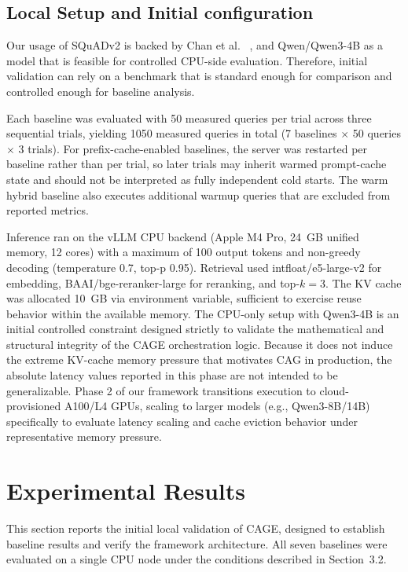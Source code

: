 \documentclass[12pt,a4paper]{article}
\let\cite\citep
\begin{document}
\subsection{Local Setup and Initial configuration}
Our usage of SQuADv2 is backed by Chan et al. ~\cite{yu2024dontdorag}, and Qwen/Qwen3-4B as a model that is feasible for controlled CPU-side evaluation. Therefore, initial validation can rely on a benchmark that is standard enough for comparison and controlled enough for baseline analysis.

Each baseline was evaluated with 50 measured queries per trial across three sequential trials, yielding 1050 measured queries in total (7 baselines $\times$ 50 queries $\times$ 3 trials). For prefix-cache-enabled baselines, the server was restarted per baseline rather than per trial, so later trials may inherit warmed prompt-cache state and should not be interpreted as fully independent cold starts. The warm hybrid baseline also executes additional warmup queries that are excluded from reported metrics.

Inference ran on the vLLM CPU backend (Apple M4 Pro, 24~GB unified memory, 12 cores) with a maximum of 100 output tokens and non-greedy decoding (temperature 0.7, top-p 0.95). Retrieval used intfloat/e5-large-v2 for embedding, BAAI/bge-reranker-large for reranking, and top-$k = 3$. The KV cache was allocated 10~GB via environment variable, sufficient to exercise reuse behavior within the available memory. The CPU-only setup with Qwen3-4B is an initial controlled constraint designed strictly to validate the mathematical and structural integrity of the CAGE orchestration logic. Because it does not induce the extreme KV-cache memory pressure that motivates CAG in production, the absolute latency values reported in this phase are not intended to be generalizable. Phase 2 of our framework transitions execution to cloud-provisioned A100/L4 GPUs, scaling to larger models (e.g., Qwen3-8B/14B) specifically to evaluate latency scaling and cache eviction behavior under representative memory pressure.


\section{Experimental Results}

This section reports the initial local validation of CAGE, designed to establish baseline results and verify the framework architecture. All seven baselines were evaluated on a single CPU node under the conditions described in Section~3.2.
\end{document}
